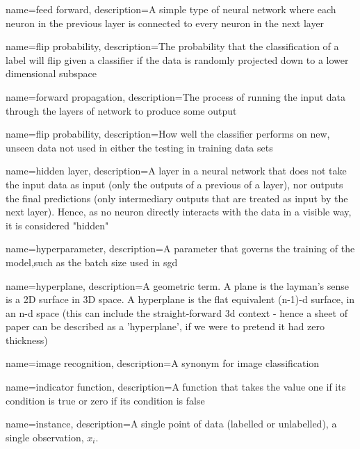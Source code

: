 {
    name=feed forward,
    description={A simple type of neural network where each neuron in the previous layer is connected to every neuron in the next layer} 
}

{
    name=flip probability,
    description={The probability that the classification of a label will flip given a classifier if the data is randomly projected down to a lower dimensional subspace}
}

{
    name=forward propagation,
    description={The process of running the input data through the layers of network to produce some output}
}

{
    name=flip probability,
    description={How well the classifier performs on new, unseen data not used in either the testing in training data sets}
}

 {
    name=hidden layer,
    description={A layer in a neural network that does not take the input data as input (only the outputs of a previous of a layer), nor outputs the final predictions (only intermediary outputs that are treated as input by the next layer). Hence, as no neuron directly interacts with the data in a visible way, it is considered "hidden"}
}

{
    name=hyperparameter,
    description={A parameter that governs the training of the model,such as the batch size used in \gls{sgd}} 
}

{
    name=hyperplane,
    description={A geometric term. A plane is the layman's sense is a 2D surface in 3D space. A hyperplane is the flat equivalent (n-1)-d surface, in an n-d space (this can include the straight-forward 3d context - hence a sheet of paper can be described as a 'hyperplane', if we were to pretend it had zero thickness)}
}

{
    name=image recognition,
    description={A synonym for image classification}
}

{
    name=indicator function,
    description={A function that takes the value one if its condition is true or zero if its condition is false}
}

{
    name={instance},
    description={A single point of data (labelled or unlabelled), a single observation, $x_i$.}
}

